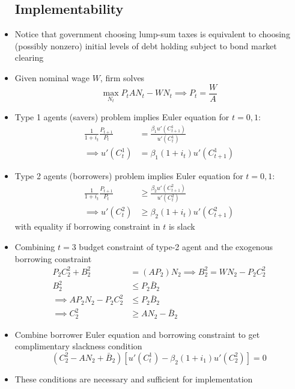\documentclass{article}
\begin{document}
\begin{itemize}
\subsection{Implementability}
\item Notice that government choosing lump-sum taxes is equivalent to choosing (possibly nonzero) initial levels of debt holding subject to bond market clearing
\item Given nominal wage $W$, firm solves
$$
\max_{N_t} P_t A N_t - W N_t \implies P_t = \frac{W}{A}
$$
\item Type 1 agents (savers) problem implies Euler equation for $t=0, 1$:
\begin{align*}
\frac{1}{1 + i_t} \frac{P_{t+1}}{P_t} &= \frac{\beta_1 u'(C_{t+1}^1)}{u'(C_t^1)}\\
\implies
u'(C_t^1) &= \beta_1 (1+i_t) u'(C_{t+1}^1)
\end{align*}
\item Type 2 agents (borrowers) problem implies Euler equation for $t=0, 1$:
\begin{align*}
\frac{1}{1 + i_t} \frac{P_{t+1}}{P_t} &\ge \frac{\beta_2 u'(C_{t+1}^2)}{u'(C_t^2)}\\
\implies
u'(C_t^2) &\ge \beta_2 (1+i_t) u'(C_{t+1}^2)
\end{align*}
with equality if borrowing constraint in $t$ is slack
\item Combining $t=3$ budget constraint of type-2 agent and the exogenous borrowing constraint
\begin{align*}
P_2 C_2^2 + B_2^2 &= (AP_2) N_2 \implies B_2^2 = W N_2 - P_2 C_2^2\\
B_2^2 &\le P_2 \bar B_2\\
\implies
AP_2 N_2 - P_2 C_2^2 &\le P_2 \bar B_2\\
\implies
C_2^2 &\ge A N_2 - \bar B_2
\end{align*}
\item Combine borrower Euler equation and borrowing constraint to get complimentary slackness condition
$$
(C_2^2 - A N_2 + \bar B_2)[u'(C_t^1) - \beta_2 (1 +i_1)u'(C_2^2) ] = 0 
$$
\item These conditions are necessary and sufficient for implementation

\end{itemize}
\end{document}
